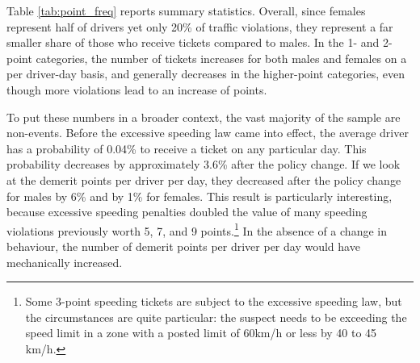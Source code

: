 

Table \ref{tab:point_freq} reports summary statistics. 
Overall, since females represent half of drivers 
yet only 20\% of traffic violations, they represent a far smaller share 
of those who receive tickets compared to males. 
In the 1- and 2-point categories, the number of tickets increases 
for both males and females on a per driver-day basis, 
and generally decreases in the higher-point categories, 
even though more violations lead to an increase of points.

To put these numbers in a broader context, 
the vast majority of the sample are non-events. 
Before the excessive speeding law came into effect, 
the average driver has a probability of 0.04\% to receive a ticket 
on any particular day. 
This probability decreases by approximately 3.6\% after the policy change. 
If we look at the demerit points per driver per day, 
they decreased after the policy change for males by 6\% and by 1\% for females. 
This result is particularly interesting, 
because excessive speeding penalties doubled the value of many 
speeding violations previously worth 5, 7, and 9 points.\footnote{%
Some 3-point speeding tickets are subject to the excessive speeding law, 
but the circumstances are quite particular: 
the suspect needs to be exceeding the speed limit in a zone 
with a posted limit of 60km/h or less by 40 to 45 km/h.}
In the absence of a change in behaviour, 
the number of demerit points per driver per day 
would have mechanically increased. %


